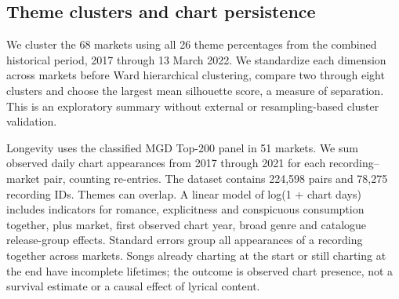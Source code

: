 \subsection{Theme clusters and chart persistence}
We cluster the 68 markets using all 26 theme percentages from the combined historical period, 2017 through 13 March 2022. We standardize each dimension across markets before Ward hierarchical clustering, compare two through eight clusters and choose the largest mean silhouette score, a measure of separation. This is an exploratory summary without external or resampling-based cluster validation.

Longevity uses the classified MGD Top-200 panel in 51 markets. We sum observed daily chart appearances from 2017 through 2021 for each recording--market pair, counting re-entries. The dataset contains 224,598 pairs and 78,275 recording IDs. Themes can overlap. A linear model of log(1 + chart days) includes indicators for romance, explicitness and conspicuous consumption together, plus market, first observed chart year, broad genre and catalogue release-group effects. Standard errors group all appearances of a recording together across markets. Songs already charting at the start or still charting at the end have incomplete lifetimes; the outcome is observed chart presence, not a survival estimate or a causal effect of lyrical content.
